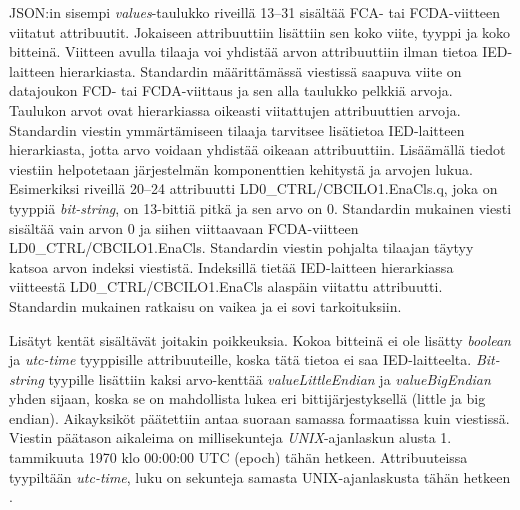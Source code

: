 JSON:in sisempi \emph{values}-taulukko riveillä 13--31 sisältää FCA- tai FCDA-viitteen viitatut attribuutit. Jokaiseen attribuuttiin lisättiin sen koko viite, tyyppi ja koko bitteinä. Viitteen avulla tilaaja voi yhdistää arvon attribuuttiin ilman tietoa IED-laitteen hierarkiasta. Standardin määrittämässä viestissä saapuva viite on datajoukon FCD- tai FCDA-viittaus ja sen alla taulukko pelkkiä arvoja. Taulukon arvot ovat hierarkiassa oikeasti viitattujen attribuuttien arvoja. Standardin viestin ymmärtämiseen tilaaja tarvitsee lisätietoa IED-laitteen hierarkiasta, jotta arvo voidaan yhdistää oikeaan attribuuttiin. Lisäämällä tiedot viestiin helpotetaan järjestelmän komponenttien kehitystä ja arvojen lukua. Esimerkiksi riveillä 20--24 attribuutti LD0\_CTRL/CBCILO1.EnaCls.q, joka on tyyppiä \emph{bit-string}, on 13-bittiä pitkä ja sen arvo on 0. Standardin mukainen viesti sisältää vain arvon 0 ja siihen viittaavaan FCDA-viitteen LD0\_CTRL/CBCILO1.EnaCls. Standardin viestin pohjalta tilaajan täytyy katsoa arvon indeksi viestistä. Indeksillä tietää IED-laitteen hierarkiassa viitteestä LD0\_CTRL/CBCILO1.EnaCls alaspäin viitattu attribuutti. Standardin mukainen ratkaisu on vaikea ja ei sovi tarkoituksiin.

Lisätyt kentät sisältävät joitakin poikkeuksia. Kokoa bitteinä ei ole lisätty \emph{boolean} ja \emph{utc-time} tyyppisille attribuuteille, koska tätä tietoa ei saa IED-laitteelta. \emph{Bit-string} tyypille lisättiin kaksi arvo-kenttää \emph{valueLittleEndian} ja \emph{valueBigEndian} yhden sijaan, koska se on mahdollista lukea eri bittijärjestyksellä (little ja big endian). Aikayksiköt päätettiin antaa suoraan samassa formaatissa kuin viestissä. Viestin päätason aikaleima on millisekunteja \emph{UNIX}-ajanlaskun alusta 1. tammikuuta 1970 klo 00:00:00 UTC (epoch) tähän hetkeen. Attribuuteissa tyypiltään \emph{utc-time}, luku on sekunteja samasta UNIX-ajanlaskusta tähän hetkeen \mbox{\cite[s.~26--27]{IEC61850-7-2}}.